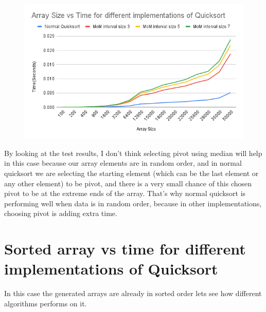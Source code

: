 \documentclass{report}
\begin{document}
\begin{figure}[H]
\centering
\includegraphics[scale=0.6]{sizevstime.png}

\end{figure}


By looking at the test results, I don't think selecting pivot using median will help in this case because our array elements are in random order, and in normal quicksort we are selecting the starting element (which can be the last element or any other element) to be pivot, and there is a very small chance of this chosen pivot to be at the extreme ends of the array. That's why normal quicksort is performing well when data is in random order, because in other implementations, choosing pivot is adding extra time.



\section*{Sorted array vs time for different implementations of Quicksort}

In this case the generated arrays are already in sorted order lets see how different algorithms performs on it.
\end{document}
